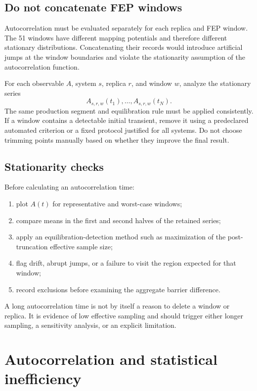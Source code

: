 \documentclass[11pt,a4paper]{article}
\begin{document}
\subsection{Do not concatenate FEP windows}

Autocorrelation must be evaluated separately for each replica and FEP window. The 51 windows have different mapping potentials and therefore different stationary distributions. Concatenating their records would introduce artificial jumps at the window boundaries and violate the stationarity assumption of the autocorrelation function.

For each observable $A$, system $s$, replica $r$, and window $w$, analyze the stationary series
\[
  A_{s,r,w}(t_1),\ldots,A_{s,r,w}(t_N).
\]
The same production segment and equilibration rule must be applied consistently. If a window contains a detectable initial transient, remove it using a predeclared automated criterion or a fixed protocol justified for all systems. Do not choose trimming points manually based on whether they improve the final result.

\subsection{Stationarity checks}

Before calculating an autocorrelation time:
\begin{enumerate}
  \item plot $A(t)$ for representative and worst-case windows;
  \item compare means in the first and second halves of the retained series;
  \item apply an equilibration-detection method such as maximization of the post-truncation effective sample size;
  \item flag drift, abrupt jumps, or a failure to visit the region expected for that window;
  \item record exclusions before examining the aggregate barrier difference.
\end{enumerate}

A long autocorrelation time is not by itself a reason to delete a window or replica. It is evidence of low effective sampling and should trigger either longer sampling, a sensitivity analysis, or an explicit limitation.

\section{Autocorrelation and statistical inefficiency}
\end{document}
